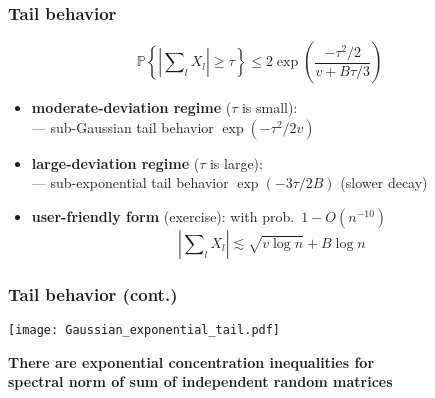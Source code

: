 \documentclass[compress,
mathserif,wide,%
]{beamer}
\begin{document}
\begin{frame}
\frametitle{Tail behavior}

\[
\mathbb{P}\left\{ \left| \sum\nolimits_{l}{X}_{l}\right| \geq \tau\right\} \leq  2 \exp\left(\frac{-\tau^{2}/2}{v+B\tau/3}\right)
\]

\bigskip

\begin{itemize}
	\itemsep1em
	\item<1> {\bf moderate-deviation regime} ($\tau$ is small): \\
		  \quad --- sub-Gaussian tail behavior $\exp(-\tau^2/2v)$
		  
	\item<1> {\bf large-deviation regime} ($\tau$ is large): \\
		  \quad --- sub-exponential tail behavior $\exp(-3\tau/2B)$ (slower decay)
	
	\item<1> {\bf user-friendly form} (exercise): with prob.~$1-O(n^{-10})$
	\begin{equation*} 
		\left| \sum\nolimits_{l}{X}_{l}\right| \lesssim  \sqrt{ v \log n } + B \log n
	\end{equation*}

\end{itemize}

\end{frame}


\begin{frame}
\frametitle{Tail behavior (cont.)}

	\begin{center}
		\texttt{[image: Gaussian\_exponential\_tail.pdf]}
	\end{center}

\end{frame}

\begin{frame}[plain]
	\vfill
	\centering
	\large \bf There are exponential concentration inequalities for \\ spectral norm of sum of independent random matrices
	\vfill
\end{frame}
\end{document}
